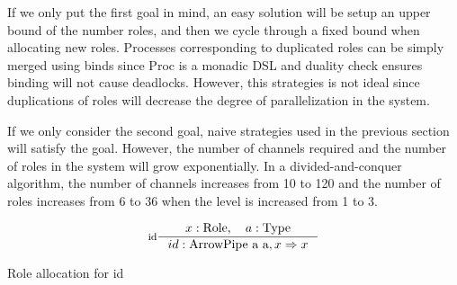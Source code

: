 If we only put the first goal in mind, an easy solution will be setup an upper bound of the number roles, and then we cycle through a fixed bound when allocating new roles. Processes corresponding to duplicated roles can be simply merged using binds since Proc is a monadic DSL and duality check ensures binding will not cause deadlocks. However, this strategies is not ideal since duplications of roles will decrease the degree of parallelization in the system.

If we only consider the second goal, naive strategies used in the previous section will satisfy the goal. However, the number of channels required and the number of roles in the system will grow exponentially. In a divided-and-conquer algorithm, the number of channels increases from 10 to 120 and the number of roles increases from 6 to 36 when the level is increased from 1 to 3.
\begin{listing}[ht]
\begin{displaymath} 
    \inference[id]{x: \text{Role}, \quad a: \text{Type}}{id : \text{ArrowPipe a a}, x \Rightarrow x}
\end{displaymath}
\caption{Role allocation for id}
\label{arrowPipe:ra:example}
\end{listing}

